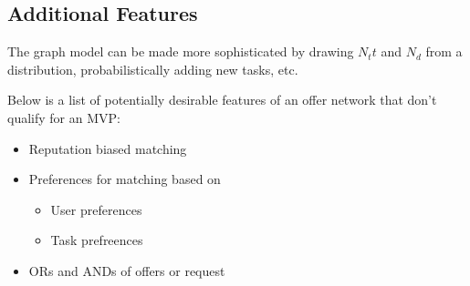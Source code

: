 \documentclass[main.tex]{subfiles}
\begin{document}
\subsection{Additional Features}

The graph model can be made more sophisticated by drawing $N_tt$ and $N_d$ from a distribution, probabilistically adding new tasks, etc.

Below is a list of potentially desirable features of an offer network that don't qualify for an MVP:
\begin{itemize}
  \item Reputation biased matching
  \item Preferences for matching based on
    \begin{itemize}
      \item User preferences
      \item Task prefreences
    \end{itemize}
  \item ORs and ANDs of offers or request
\end{itemize}
\end{document}
